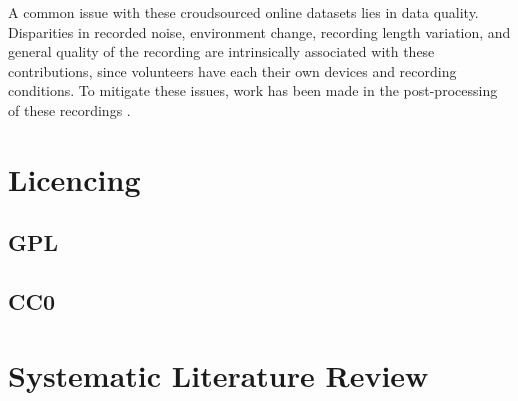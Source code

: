 A common issue with these croudsourced online datasets lies in data quality. Disparities in recorded noise, environment change, recording length variation, and general quality of the recording are intrinsically associated with these contributions, since volunteers have each their own devices and recording conditions. To mitigate these issues, work has been made in the post-processing of these recordings \cite{krishna2019speech}.

\section{Licencing}
\subsection{GPL}
\subsection{CC0}

\section{Systematic Literature Review}

